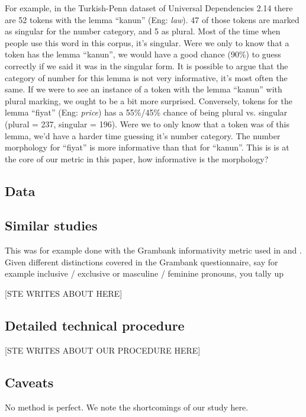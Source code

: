 \documentclass[a4paper]{article}
\begin{document}
For example, in the Turkish-Penn dataset of Universal Dependencies 2.14 there are 52 tokens with the lemma ``kanun'' (Eng: \textit{law}). 47 of those tokens are marked as singular for the number category, and 5 as plural. Most of the time when people use this word in this corpus, it's singular.
Were we only to know that a token has the lemma ``kanun'', we would have a good chance (90\%) to guess correctly if we said it was in the singular form.
It is possible to argue that the category of number for this lemma is not very informative, it's most often the same.
If we were to see an instance of a token with the lemma ``kanun'' with plural marking, we ought to be a bit more surprised.
Conversely, tokens for the lemma ``fiyat'' (Eng: \textit{price}) has a 55\%/45\% chance of being plural vs. singular (plural = 237, singular = 196). Were we to only know that a token was of this lemma, we'd have a harder time guessing it's number category. The number morphology for ``fiyat'' is more informative than that for ``kanun''.
This is is at the core of our metric in this paper, how informative is the morphology?



\subsection{Data}
\citet{UD_2.14}

\subsection{Similar studies}

This was for example done with the Grambank informativity metric used in \cite{grambank_release} and \citet{shcherbakova2023societies}. Given different distinctions covered in the Grambank questionnaire, say for example inclusive / exclusive or masculine / feminine pronouns, you tally up 

[STE WRITES ABOUT \citet{ccoltekin2023complexity} HERE]

\subsection{Detailed technical procedure}

[STE WRITES ABOUT OUR PROCEDURE HERE]

\subsection{Caveats}
No method is perfect. We note the shortcomings of our study here. 
\end{document}
